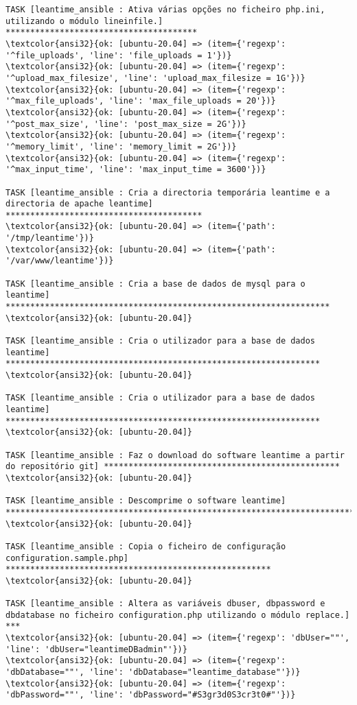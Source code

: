 \documentclass{scrartcl}
\begin{document}
\begin{Verbatim}
TASK [leantime_ansible : Ativa várias opções no ficheiro php.ini, utilizando o módulo lineinfile.] ***************************************
\textcolor{ansi32}{ok: [ubuntu-20.04] => (item={'regexp': '^file_uploads', 'line': 'file_uploads = 1'})}
\textcolor{ansi32}{ok: [ubuntu-20.04] => (item={'regexp': '^upload_max_filesize', 'line': 'upload_max_filesize = 1G'})}
\textcolor{ansi32}{ok: [ubuntu-20.04] => (item={'regexp': '^max_file_uploads', 'line': 'max_file_uploads = 20'})}
\textcolor{ansi32}{ok: [ubuntu-20.04] => (item={'regexp': '^post_max_size', 'line': 'post_max_size = 2G'})}
\textcolor{ansi32}{ok: [ubuntu-20.04] => (item={'regexp': '^memory_limit', 'line': 'memory_limit = 2G'})}
\textcolor{ansi32}{ok: [ubuntu-20.04] => (item={'regexp': '^max_input_time', 'line': 'max_input_time = 3600'})}

TASK [leantime_ansible : Cria a directoria temporária leantime e a directoria de apache leantime] ****************************************
\textcolor{ansi32}{ok: [ubuntu-20.04] => (item={'path': '/tmp/leantime'})}
\textcolor{ansi32}{ok: [ubuntu-20.04] => (item={'path': '/var/www/leantime'})}

TASK [leantime_ansible : Cria a base de dados de mysql para o leantime] ******************************************************************
\textcolor{ansi32}{ok: [ubuntu-20.04]}

TASK [leantime_ansible : Cria o utilizador para a base de dados leantime] ****************************************************************
\textcolor{ansi32}{ok: [ubuntu-20.04]}

TASK [leantime_ansible : Cria o utilizador para a base de dados leantime] ****************************************************************
\textcolor{ansi32}{ok: [ubuntu-20.04]}

TASK [leantime_ansible : Faz o download do software leantime a partir do repositório git] ************************************************
\textcolor{ansi32}{ok: [ubuntu-20.04]}

TASK [leantime_ansible : Descomprime o software leantime] ********************************************************************************
\textcolor{ansi32}{ok: [ubuntu-20.04]}

TASK [leantime_ansible : Copia o ficheiro de configuração configuration.sample.php] ******************************************************
\textcolor{ansi32}{ok: [ubuntu-20.04]}

TASK [leantime_ansible : Altera as variáveis dbuser, dbpassword e dbdatabase no ficheiro configuration.php utilizando o módulo replace.] ***
\textcolor{ansi32}{ok: [ubuntu-20.04] => (item={'regexp': 'dbUser=""', 'line': 'dbUser="leantimeDBadmin"'})}
\textcolor{ansi32}{ok: [ubuntu-20.04] => (item={'regexp': 'dbDatabase=""', 'line': 'dbDatabase="leantime_database"'})}
\textcolor{ansi32}{ok: [ubuntu-20.04] => (item={'regexp': 'dbPassword=""', 'line': 'dbPassword="#S3gr3d0S3cr3t0#"'})}


\end{Verbatim}
\end{document}
